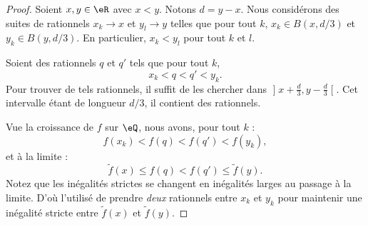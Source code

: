 \begin{proof}
    Soient \( x,y\in \eR\) avec \( x<y\). Notons \( d=y-x\). Nous considérons des suites de rationnels \( x_k\to x\) et \( y_l\to y\) telles que pour tout \( k\), \( x_k\in B(x,d/3)\) et \( y_k\in B(y,d/3)\). En particulier, \( x_k<y_l\) pour tout \( k\) et \( l\).

    Soient des rationnels \( q\) et \( q'\) tels que pour tout \( k\),
    \begin{equation}
        x_k<q<q'<y_k.
    \end{equation}
    Pour trouver de tels rationnels, il suffit de les chercher dans \( \mathopen] x+\frac{ d }{ 3 } , y-\frac{ d }{ 3 } \mathclose[\). Cet intervalle étant de longueur \( d/3\), il contient des rationnels.

    Vue la croissance de \( f\) sur \( \eQ\), nous avons, pour tout \( k\) :
    \begin{equation}
        f(x_k)<f(q)<f(q')<f(y_k),
    \end{equation}
    et à la limite :
    \begin{equation}
        \tilde f(x)\leq f(q)<f(q')\leq \tilde f(y).
    \end{equation}
    Notez que les inégalités strictes se changent en inégalités larges au passage à la limite. D'où l'utilisé de prendre \emph{deux} rationnels entre \( x_k\) et \( y_k\) pour maintenir une inégalité stricte entre \(\tilde f(x)\) et \( \tilde f(y)\).
\end{proof}

